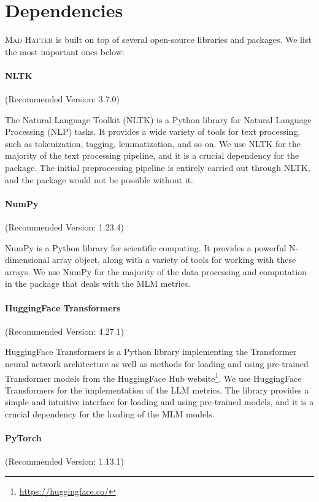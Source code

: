 \section{Dependencies}

\textsc{Mad Hatter} is built on top of several open-source libraries and packages. We list the most important ones below:

\paragraph{NLTK}  (Recommended Version: 3.7.0)


The Natural Language Toolkit (NLTK) is a Python library for Natural Language Processing (NLP) tasks. It provides a wide variety of tools for text processing, such as tokenization, tagging, lemmatization, and so on. We use NLTK for the majority of the text processing pipeline, and it is a crucial dependency for the package. The initial preprocessing pipeline is entirely carried out through NLTK, and the package would not be possible without it.

\paragraph{NumPy} (Recommended Version: 1.23.4)

NumPy is a Python library for scientific computing. It provides a powerful N-dimensional array object, along with a variety of tools for working with these arrays. We use NumPy for the majority of the data processing and computation in the package that deals with the MLM metrics. 

\paragraph{HuggingFace Transformers} (Recommended Version: 4.27.1)

HuggingFace Transformers is a Python library implementing the Transformer neural network architecture as well as methods for loading and using pre-trained Transformer models from the HuggingFace Hub website\footnote{\url{https://huggingface.co/}}. We use HuggingFace Transformers for the implementation of the LLM metrics. The library provides a simple and intuitive interface for loading and using pre-trained models, and it is a crucial dependency for the loading of the MLM models.

\paragraph{PyTorch} (Recommended Version: 1.13.1)


